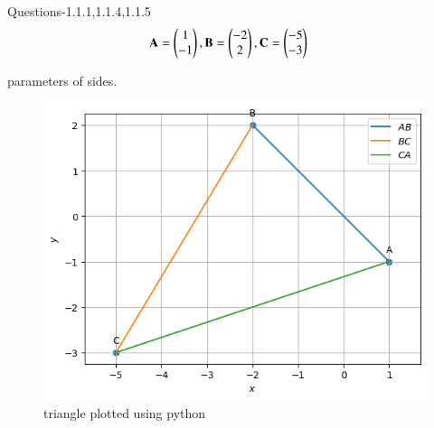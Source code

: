 \documentclass[book,11pt]{IEEEtran}
\begin{document}
 \vspace{3cm}
Questions-1.1.1,1.1.4,1.1.5
\begin{align}
\mathbf{A}&=\begin{pmatrix}1\\-1\end{pmatrix},
\mathbf{B}=\begin{pmatrix}-2\\2\end{pmatrix},
\mathbf{C}=\begin{pmatrix}-5\\-3\end{pmatrix}
\end{align}
\begin{table}[!ht]
        \centering
        
        \caption{parameters of sides.}
        \label{tab:paramaters of sides}
    \end{table}
\begin{figure}[H]
\includegraphics[width=\columnwidth]{./figs/Triangle.png}
\caption{triangle plotted using python}
\label{fig:i_triangle_py}
\end{figure}
\end{document}
